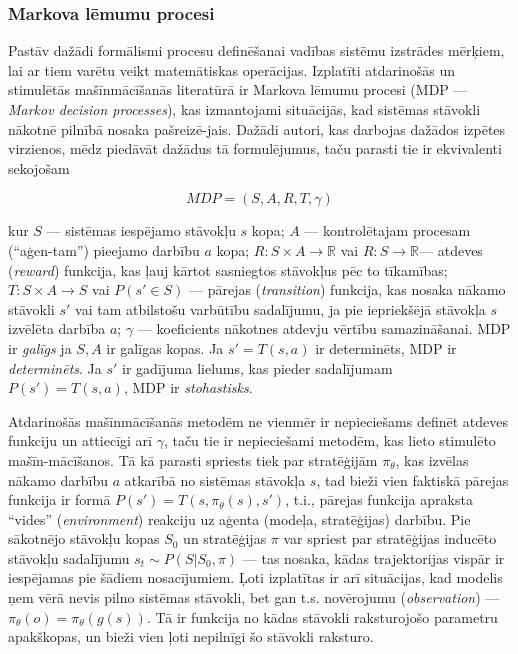 \documentclass[12pt, a4paper]{article}
\numberwithin{equation}{section} %
\begin{document}
\subsubsection{Markova lēmumu procesi}

Pastāv dažādi formālismi procesu definēšanai vadības sistēmu izstrādes mērķiem, lai ar tiem varētu veikt matemātiskas operācijas. Izplatīti atdarinošās un stimulētās mašīnmācīšanās literatūrā ir Markova lēmumu procesi (MDP --- \textit{Markov decision processes}), kas izmantojami situācijās, kad sistēmas stāvokli nākotnē pilnībā nosaka pašreizē-jais. Dažādi autori, kas darbojas dažādos izpētes virzienos, mēdz piedāvāt dažādus tā formulējumus, taču parasti tie ir ekvivalenti sekojošam\cite{attia2018global}

\begin{equation} 
    MDP = (S,A,R,T, \gamma)
\end{equation}

kur $S$ --- sistēmas iespējamo stāvokļu $s$ kopa; $A$ --- kontrolētajam procesam (``aģen-tam'') pieejamo darbību $a$ kopa; $R: S \times A \rightarrow \mathbb{R}$ vai $R: S \rightarrow \mathbb{R}$--- atdeves (\textit{reward}) funkcija, kas ļauj kārtot sasniegtos stāvokļus pēc to tīkamības; $T: S \times A \rightarrow S$ vai $P(s' \in S)$ --- pārejas (\textit{transition}) funkcija, kas nosaka nākamo stāvokli $s'$ vai tam atbilstošu varbūtību sadalījumu, ja pie iepriekšējā stāvokļa $s$ izvēlēta darbība $a$; $\gamma$ --- koeficients nākotnes atdevju vērtību samazināšanai. MDP ir \textit{galīgs} ja $S,A$ ir galīgas kopas. Ja $s' = T(s,a)$ ir determinēts, MDP ir \textit{determinēts}. Ja $s'$ ir gadījuma lielums, kas pieder sadalījumam $P(s')=T(s,a)$, MDP ir \textit{stohastisks}.

Atdarinošās mašīnmācīšanās metodēm ne vienmēr ir nepieciešams definēt atdeves funkciju un attiecīgi arī $\gamma$, taču tie ir nepieciešami metodēm, kas lieto stimulēto mašīn-mācīšanos. Tā kā parasti spriests tiek par stratēģijām $\pi_{\theta}$, kas izvēlas nākamo darbību $a$ atkarībā no sistēmas stāvokļa $s$, tad bieži vien faktiskā pārejas funkcija ir formā $P(s') = T(s, \pi_{\theta}(s), s')$, t.i., pārejas funkcija apraksta ``vides'' (\textit{environment}) reakciju uz aģenta (modeļa, stratēģijas) darbību. Pie sākotnējo stāvokļu kopas $S_0$ un stratēģijas $\pi$ var spriest par stratēģijas inducēto stāvokļu sadalījumu $s_t \sim P(S \vert S_0, \pi)$ --- tas nosaka, kādas trajektorijas vispār ir iespējamas pie šādiem nosacījumiem. Ļoti izplatītas ir arī situācijas, kad modelis ņem vērā nevis pilno sistēmas stāvokli, bet gan t.s. novērojumu (\textit{observation}) --- $\pi_{\theta}(o)=\pi_{\theta}(g(s))$. Tā ir funkcija no kādas stāvokli raksturojošo parametru apakškopas, un bieži vien ļoti nepilnīgi šo stāvokli raksturo. 
\end{document}

